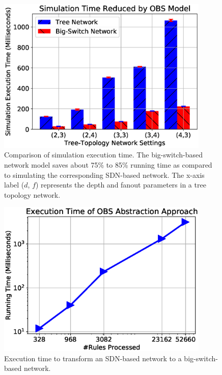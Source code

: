 \begin{figure}[ht]
    \centering
    \includegraphics[width=0.9\textwidth]{OneBigSwitch/figures/comp_sim_time.eps}
    \caption[Comparison of Simulation Execution Time]{Comparison of simulation execution time.
        The big-switch-based network model saves about 75\% to 85\% running time
        as compared to simulating the corresponding SDN-based network.
        The x-axis label ($d$, $f$) represents the depth and fanout parameters in a tree topology network.}
    \label{OBS:Fig:CompareSimulationTime}
\end{figure}

\begin{figure}[ht]
    \centering
    \includegraphics[width=0.9\textwidth]{OneBigSwitch/figures/bs_overhead.eps}
    \caption[Execution Time of One-Big-Switch Abstraction]{Execution time to transform an SDN-based network to a big-switch-based network.}
    \label{OBS:Fig:BSOverhead}
\end{figure}

